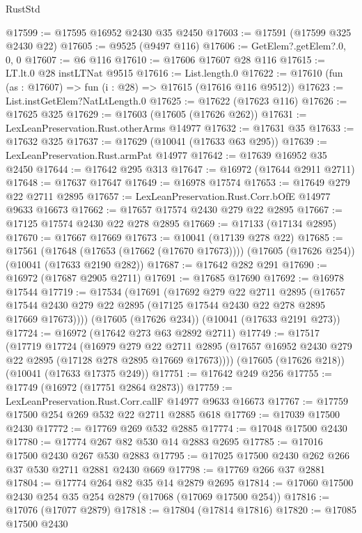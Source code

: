 \begin{lexlean}{RustStd}
\begin{coremodule}
@17599 := @17595 @16952 @2430 @35 @2450
@17603 := @17591 (@17599 @325 @2430 @22)
@17605 := @9525 (@9497 @116)
@17606 := GetElem?.getElem?.{0, 0, 0}
@17607 := @6 @116
@17610 := @17606 @17607 @28 @116
@17615 := LT.lt.{0} @28 instLTNat @9515
@17616 := List.length.{0}
@17622 := @17610 (fun (as : @17607) => fun (i : @28) => @17615 (@17616 @116 @9512))
@17623 := List.instGetElem?NatLtLength.{0}
@17625 := @17622 (@17623 @116)
@17626 := @17625 @325
@17629 := @17603 (@17605 (@17626 @262))
@17631 := LexLeanPreservation.Rust.otherArms @14977
@17632 := @17631 @35
@17633 := @17632 @325
@17637 := @17629 (@10041 (@17633 @63 @295))
@17639 := LexLeanPreservation.Rust.armPat @14977
@17642 := @17639 @16952 @35 @2450
@17644 := @17642 @295 @313
@17647 := @16972 (@17644 @2911 @2711)
@17648 := @17637 @17647
@17649 := @16978 @17574
@17653 := @17649 @279 @22 @2711 @2895
@17657 := LexLeanPreservation.Rust.Corr.bOfE @14977 @9633 @16673
@17662 := @17657 @17574 @2430 @279 @22 @2895
@17667 := @17125 @17574 @2430 @22 @278 @2895
@17669 := @17133 (@17134 @2895)
@17670 := @17667 @17669
@17673 := @10041 (@17139 @278 @22)
@17685 := @17561
    (@17648 (@17653 (@17662 (@17670 @17673))))
    (@17605 (@17626 @254))
    (@10041 (@17633 @2190 @282))
@17687 := @17642 @282 @291
@17690 := @16972 (@17687 @2905 @2711)
@17691 := @17685 @17690
@17692 := @16978 @17544
@17719 := @17534
    (@17691
      (@17692
        @279
        @22
        @2711
        @2895
        (@17657 @17544 @2430 @279 @22 @2895 (@17125 @17544 @2430 @22 @278 @2895 @17669 @17673))))
    (@17605 (@17626 @234))
    (@10041 (@17633 @2191 @273))
@17724 := @16972 (@17642 @273 @63 @2892 @2711)
@17749 := @17517
    (@17719
      @17724
      (@16979
        @279
        @22
        @2711
        @2895
        (@17657 @16952 @2430 @279 @22 @2895 (@17128 @278 @2895 @17669 @17673))))
    (@17605 (@17626 @218))
    (@10041 (@17633 @17375 @249))
@17751 := @17642 @249 @256
@17755 := @17749 (@16972 (@17751 @2864 @2873))
@17759 := LexLeanPreservation.Rust.Corr.callF @14977 @9633 @16673
@17767 := @17759 @17500 @254 @269 @532 @22 @2711 @2885 @618
@17769 := @17039 @17500 @2430
@17772 := @17769 @269 @532 @2885
@17774 := @17048 @17500 @2430
@17780 := @17774 @267 @82 @530 @14 @2883 @2695
@17785 := @17016 @17500 @2430 @267 @530 @2883
@17795 := @17025 @17500 @2430 @262 @266 @37 @530 @2711 @2881 @2430 @669
@17798 := @17769 @266 @37 @2881
@17804 := @17774 @264 @82 @35 @14 @2879 @2695
@17814 := @17060 @17500 @2430 @254 @35 @254 @2879 (@17068 (@17069 @17500 @254))
@17816 := @17076 (@17077 @2879)
@17818 := @17804 (@17814 @17816)
@17820 := @17085 @17500 @2430

\end{coremodule}
\end{lexlean}
